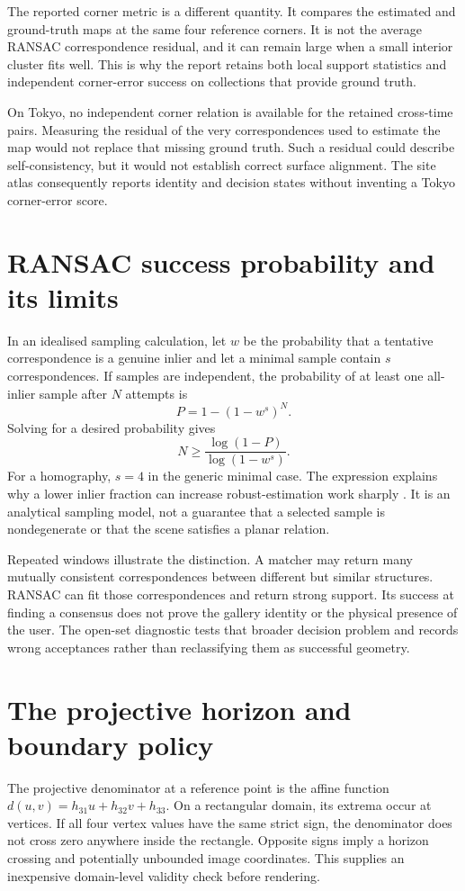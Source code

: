 The reported corner metric is a different quantity. It compares the estimated and ground-truth maps at the same four reference corners. It is not the average RANSAC correspondence residual, and it can remain large when a small interior cluster fits well. This is why the report retains both local support statistics and independent corner-error success on collections that provide ground truth.

On Tokyo, no independent corner relation is available for the retained cross-time pairs. Measuring the residual of the very correspondences used to estimate the map would not replace that missing ground truth. Such a residual could describe self-consistency, but it would not establish correct surface alignment. The site atlas consequently reports identity and decision states without inventing a Tokyo corner-error score.

\section{RANSAC success probability and its limits}
In an idealised sampling calculation, let $w$ be the probability that a tentative correspondence is a genuine inlier and let a minimal sample contain $s$ correspondences. If samples are independent, the probability of at least one all-inlier sample after $N$ attempts is
\begin{equation}
 P=1-(1-w^s)^N.
\end{equation}
Solving for a desired probability gives
\begin{equation}
 N\geq\frac{\log(1-P)}{\log(1-w^s)}.
\end{equation}
For a homography, $s=4$ in the generic minimal case. The expression explains why a lower inlier fraction can increase robust-estimation work sharply \citep{fischler1981}. It is an analytical sampling model, not a guarantee that a selected sample is nondegenerate or that the scene satisfies a planar relation.

Repeated windows illustrate the distinction. A matcher may return many mutually consistent correspondences between different but similar structures. RANSAC can fit those correspondences and return strong support. Its success at finding a consensus does not prove the gallery identity or the physical presence of the user. The open-set diagnostic tests that broader decision problem and records wrong acceptances rather than reclassifying them as successful geometry.

\section{The projective horizon and boundary policy}
The projective denominator at a reference point is the affine function $d(u,v)=h_{31}u+h_{32}v+h_{33}$. On a rectangular domain, its extrema occur at vertices. If all four vertex values have the same strict sign, the denominator does not cross zero anywhere inside the rectangle. Opposite signs imply a horizon crossing and potentially unbounded image coordinates. This supplies an inexpensive domain-level validity check before rendering.

